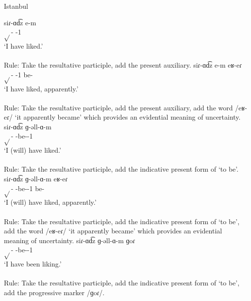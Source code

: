 \begin{exe}
	\ex Istanbul \label{sent:Istanbul:morpho:verb:complex:resultpart} 
	\begin{xlist}
		\ex \gll siɾ-ɑd͡z e-m \\
		$\sqrt{}$-{\rptcp} {\aux}-1{\sg}\\
		\trans `I have liked.'\\
		 \\
		Rule: Take the resultative participle, add the present auxiliary.
		\ex \gll siɾ-ɑd͡z e-m eʁ-eɾ \\
		$\sqrt{}$-{\rptcp} {\aux}-1{\sg} be-{\eptcp} \\
		\trans `I have liked, apparently.' \\
		 \\
		Rule: Take the resultative participle, add the present auxiliary, add the word /eʁ-eɾ/ `it apparently became' which provides an evidential meaning of uncertainty.
		\ex \gll siɾ-ɑd͡z ɡ-əll-ɑ-m \\
		$\sqrt{}$-{\rptcp} {\ind}-be-{\thgloss}-1{\sg} \\
		\trans `I (will) have liked.'\\
		 \\
		Rule: Take the resultative participle, add the indicative present form of `to be'.
		\ex \gll siɾ-ɑd͡z ɡ-əll-ɑ-m eʁ-eɾ \\
		$\sqrt{}$-{\rptcp} {\ind}-be-{\thgloss}-1{\sg} be-{\eptcp}\\
		\trans `I (will) have liked, apparently.' \\
		 \\
		Rule: Take the resultative participle, add the indicative present form of `to be', add the word /eʁ-eɾ/ `it apparently became' which provides an evidential meaning of uncertainty.
		\ex \gll siɾ-ɑd͡z ɡ-əll-ɑ-m ɡoɾ \\
		$\sqrt{}$-{\rptcp} {\ind}-be-{\thgloss}-1{\sg} {\prog} \\
		\trans `I have been liking.' \\
		 \\
		Rule: Take the resultative participle, add the indicative present form of `to be', add the progressive marker /ɡoɾ/. 
		

\end{xlist}
\end{exe}
